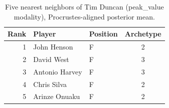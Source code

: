 \begin{table}[htbp]
  \centering\small
  \begin{tabular}{rllc}
    \toprule
    Rank & Player & Position & Archetype \\
    \midrule
    1 & John Henson & F & 2 \\
    2 & David West & F & 3 \\
    3 & Antonio Harvey & F & 3 \\
    4 & Chris Silva & F & 2 \\
    5 & Arinze Onuaku & F & 2 \\
    \bottomrule
  \end{tabular}
  \caption{Five nearest neighbors of Tim Duncan (peak_value modality), Procrustes-aligned posterior mean.}
  \label{tab:Tim_Duncan_neighbors_peak_value}
\end{table}

